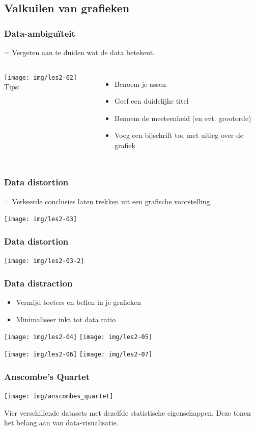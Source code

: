 \subsection{Valkuilen van grafieken}

\begin{frame}
	\frametitle{Data-ambiguïteit}
	
	= Vergeten aan te duiden wat de data betekent.
	\vspace{1cm}
	
	\begin{columns}
		\texttt{[image: img/les2-02]}
		Tips:
		\begin{itemize}
			\item Benoem je assen
			\item Geef een duidelijke titel
			\item Benoem de meeteenheid (en evt. grootorde)
			\item Voeg een bijschrift toe met uitleg over de grafiek
		\end{itemize}
	\end{columns}
\end{frame}

\begin{frame}
	\frametitle{Data distortion}
	
	= Verkeerde conclusies laten trekken uit een grafische voorstelling
	
	\begin{center}
		\texttt{[image: img/les2-03]}
	\end{center}
\end{frame}

\begin{frame}
	\frametitle{Data distortion}
	
	\begin{center}
		\texttt{[image: img/les2-03-2]}
	\end{center}
\end{frame}

\begin{frame}
	\frametitle{Data distraction}
	
	\begin{itemize}
		\item Vermijd toeters en bellen in je grafieken
		\item Minimaliseer inkt tot data ratio
	\end{itemize}
	
	\centering
	\texttt{[image: img/les2-04]}
	\texttt{[image: img/les2-05]}
	
	\texttt{[image: img/les2-06]}
	\texttt{[image: img/les2-07]}
\end{frame}

\begin{frame}
	\frametitle{Anscombe's Quartet}
	
	\centering
	\texttt{[image: img/anscombes\_quartet]}
	
	Vier verschillende datasets met dezelfde statistische eigenschappen. Deze tonen het belang aan van data-visualisatie.
\end{frame}





